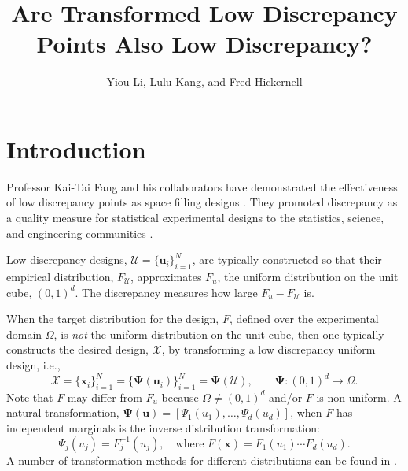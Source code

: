 \documentclass[graybox]{svmult}
\newcommand{\vx}{\boldsymbol{x}}
\newcommand{\vu}{\boldsymbol{u}}
\newcommand{\vPsi}{\boldsymbol{\Psi}}
\newcommand{\Udes}{\mathcal{U}}
\newcommand{\Xdes}{\mathcal{X}}
\newcommand{\Ftar}{F}
\newcommand{\cube}{\ensuremath{(0,1)^d}}
\begin{document}
\title*{Are Transformed Low Discrepancy Points Also Low Discrepancy?}
\author{Yiou Li, Lulu Kang, and Fred Hickernell}
%
%
\maketitle


\section{Introduction}

Professor Kai-Tai Fang and his collaborators have demonstrated the effectiveness of low discrepancy points as space filling designs \cite{FanWan94, FanLiSud06, FangHic07a}.  
They promoted discrepancy as a quality measure for statistical experimental designs to the statistics, science, and engineering communities \cite{FanMaWin02, FanMuk00, FanMa01a, FanMa01b}. 

Low discrepancy designs, $\Udes = \{\vu_i\}_{i=1}^N$, are typically constructed so that their empirical distribution, $F_\Udes$, approximates $F_u$, the uniform distribution on the unit cube, \cube.  
The discrepancy measures how large $F_u-F_\Udes$ is.  

When the target distribution for the design, $\Ftar$, defined over the experimental domain $\Omega$, is \emph{not} the uniform distribution on the unit cube, then one typically constructs the desired design, $\Xdes$, by transforming a low discrepancy uniform design, i.e., 
\begin{equation} \label{eq:transPts}
\Xdes = \{\vx_i\}_{i=1}^N = \{\vPsi(\vu_i)\}_{i=1}^N = \vPsi(\Udes), \qquad \vPsi: \cube \to \Omega.
\end{equation}
Note that $\Ftar$ may differ from $F_u$ because $\Omega \ne \cube$ and/or $\Ftar$ is non-uniform.  
A natural transformation, $\vPsi(\vu)=[\Psi_1(u_1),\ldots,\Psi_d(u_d)]$, when $\Ftar$ has independent marginals is the inverse distribution transformation:
\begin{equation}\label{eq:inverse}
\Psi_j(u_j) = F_j^{-1}(u_j), \quad \text{where } \Ftar(\vx) = F_1(u_1) \cdots F_d(u_d).
\end{equation}
A number of transformation methods for different distributions can be found in \cite{devroye2006nonuniform}. 
\end{document}
